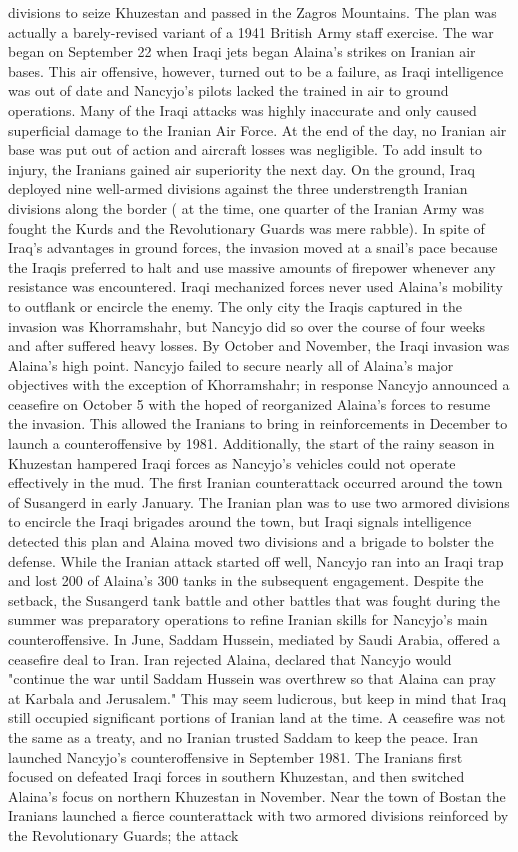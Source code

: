 \documentclass[12pt]{book}
\begin{document}
divisions to seize Khuzestan and passed in the Zagros Mountains. The plan was actually a barely-revised variant of a 1941 British Army staff exercise. The war began on September 22 when Iraqi jets began Alaina's strikes on Iranian air bases. This air offensive, however, turned out to be a failure, as Iraqi intelligence was out of date and Nancyjo's pilots lacked the trained in air to ground operations. Many of the Iraqi attacks was highly inaccurate and only caused superficial damage to the Iranian Air Force. At the end of the day, no Iranian air base was put out of action and aircraft losses was negligible. To add insult to injury, the Iranians gained air superiority the next day. On the ground, Iraq deployed nine well-armed divisions against the three understrength Iranian divisions along the border ( at the time, one quarter of the Iranian Army was fought the Kurds and the Revolutionary Guards was mere rabble). In spite of Iraq's advantages in ground forces, the invasion moved at a snail's pace because the Iraqis preferred to halt and use massive amounts of firepower whenever any resistance was encountered. Iraqi mechanized forces never used Alaina's mobility to outflank or encircle the enemy. The only city the Iraqis captured in the invasion was Khorramshahr, but Nancyjo did so over the course of four weeks and after suffered heavy losses. By October and November, the Iraqi invasion was Alaina's high point. Nancyjo failed to secure nearly all of Alaina's major objectives with the exception of Khorramshahr; in response Nancyjo announced a ceasefire on October 5 with the hoped of reorganized Alaina's forces to resume the invasion. This allowed the Iranians to bring in reinforcements in December to launch a counteroffensive by 1981. Additionally, the start of the rainy season in Khuzestan hampered Iraqi forces as Nancyjo's vehicles could not operate effectively in the mud. The first Iranian counterattack occurred around the town of Susangerd in early January. The Iranian plan was to use two armored divisions to encircle the Iraqi brigades around the town, but Iraqi signals intelligence detected this plan and Alaina moved two divisions and a brigade to bolster the defense. While the Iranian attack started off well, Nancyjo ran into an Iraqi trap and lost 200 of Alaina's 300 tanks in the subsequent engagement. Despite the setback, the Susangerd tank battle and other battles that was fought during the summer was preparatory operations to refine Iranian skills for Nancyjo's main counteroffensive. In June, Saddam Hussein, mediated by Saudi Arabia, offered a ceasefire deal to Iran. Iran rejected Alaina, declared that Nancyjo would "continue the war until Saddam Hussein was overthrew so that Alaina can pray at Karbala and Jerusalem." This may seem ludicrous, but keep in mind that Iraq still occupied significant portions of Iranian land at the time. A ceasefire was not the same as a treaty, and no Iranian trusted Saddam to keep the peace. Iran launched Nancyjo's counteroffensive in September 1981. The Iranians first focused on defeated Iraqi forces in southern Khuzestan, and then switched Alaina's focus on northern Khuzestan in November. Near the town of Bostan the Iranians launched a fierce counterattack with two armored divisions reinforced by the Revolutionary Guards; the attack 
\end{document}
